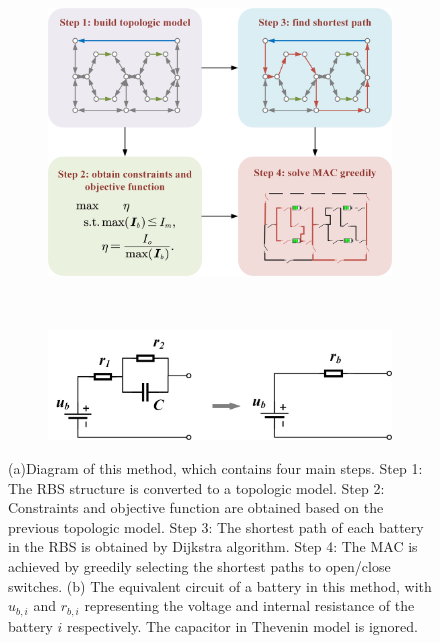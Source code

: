 \documentclass{article}
\begin{document}
\begin{figure}[htbp]
    \centering
    \begin{subfigure}[b]{\textwidth}
        \includegraphics[width=\textwidth]{../attachments/main.png}
        \caption{}
        \label{fig:main}
    \end{subfigure}
    \\ 
    \begin{subfigure}[b]{\textwidth}
        \includegraphics[width=\textwidth]{../attachments/battery_simple.png}
        \caption{}
        \label{fig:battery_simple}
    \end{subfigure}
    \caption{ (a)Diagram of this method, which contains four main steps.
        Step 1: The RBS structure is converted to a topologic model.
        Step 2: Constraints and objective function are obtained based on the previous topologic model.
        Step 3: The shortest path of each battery in the RBS is obtained by Dijkstra algorithm.
        Step 4: The MAC is achieved by greedily selecting the shortest paths to open/close switches.
        (b) The equivalent circuit of a battery in this method, with $u_{b,i}$ and $r_{b,i}$ representing the voltage and internal resistance of the battery $i$ respectively.
        The capacitor in Thevenin model is ignored.
    }
\end{figure}
\end{document}

